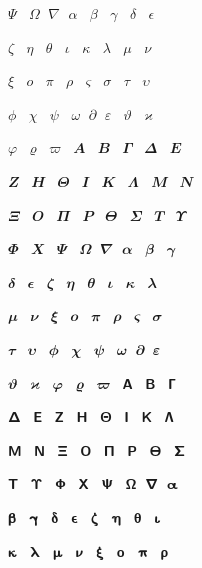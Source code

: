 \documentclass{article}
\begin{document}
$\mitPsi$ $\mitOmega$ $\mitnabla$ $\mitalpha$ $\mitbeta$ $\mitgamma$ $\mitdelta$ $\mitvarepsilon$ \par
$\mitzeta$ $\miteta$ $\mittheta$ $\mitiota$ $\mitkappa$ $\mitlambda$ $\mitmu$ $\mitnu$ \par
$\mitxi$ $\mitomicron$ $\mitpi$ $\mitrho$ $\mitvarsigma$ $\mitsigma$ $\mittau$ $\mitupsilon$ \par
$\mitvarphi$ $\mitchi$ $\mitpsi$ $\mitomega$ $\mitpartial$ $\mitepsilon$ $\mitvartheta$ $\mitvarkappa$ \par
$\mitphi$ $\mitvarrho$ $\mitvarpi$ $\mbfitAlpha$ $\mbfitBeta$ $\mbfitGamma$ $\mbfitDelta$ $\mbfitEpsilon$ \par
$\mbfitZeta$ $\mbfitEta$ $\mbfitTheta$ $\mbfitIota$ $\mbfitKappa$ $\mbfitLambda$ $\mbfitMu$ $\mbfitNu$ \par
$\mbfitXi$ $\mbfitOmicron$ $\mbfitPi$ $\mbfitRho$ $\mbfitvarTheta$ $\mbfitSigma$ $\mbfitTau$ $\mbfitUpsilon$ \par
$\mbfitPhi$ $\mbfitChi$ $\mbfitPsi$ $\mbfitOmega$ $\mbfitnabla$ $\mbfitalpha$ $\mbfitbeta$ $\mbfitgamma$ \par
$\mbfitdelta$ $\mbfitvarepsilon$ $\mbfitzeta$ $\mbfiteta$ $\mbfittheta$ $\mbfitiota$ $\mbfitkappa$ $\mbfitlambda$ \par
$\mbfitmu$ $\mbfitnu$ $\mbfitxi$ $\mbfitomicron$ $\mbfitpi$ $\mbfitrho$ $\mbfitvarsigma$ $\mbfitsigma$ \par
$\mbfittau$ $\mbfitupsilon$ $\mbfitvarphi$ $\mbfitchi$ $\mbfitpsi$ $\mbfitomega$ $\mbfitpartial$ $\mbfitepsilon$ \par
$\mbfitvartheta$ $\mbfitvarkappa$ $\mbfitphi$ $\mbfitvarrho$ $\mbfitvarpi$ $\mbfsansAlpha$ $\mbfsansBeta$ $\mbfsansGamma$ \par
$\mbfsansDelta$ $\mbfsansEpsilon$ $\mbfsansZeta$ $\mbfsansEta$ $\mbfsansTheta$ $\mbfsansIota$ $\mbfsansKappa$ $\mbfsansLambda$ \par
$\mbfsansMu$ $\mbfsansNu$ $\mbfsansXi$ $\mbfsansOmicron$ $\mbfsansPi$ $\mbfsansRho$ $\mbfsansvarTheta$ $\mbfsansSigma$ \par
$\mbfsansTau$ $\mbfsansUpsilon$ $\mbfsansPhi$ $\mbfsansChi$ $\mbfsansPsi$ $\mbfsansOmega$ $\mbfsansnabla$ $\mbfsansalpha$ \par
$\mbfsansbeta$ $\mbfsansgamma$ $\mbfsansdelta$ $\mbfsansvarepsilon$ $\mbfsanszeta$ $\mbfsanseta$ $\mbfsanstheta$ $\mbfsansiota$ \par
$\mbfsanskappa$ $\mbfsanslambda$ $\mbfsansmu$ $\mbfsansnu$ $\mbfsansxi$ $\mbfsansomicron$ $\mbfsanspi$ $\mbfsansrho$ \par
\end{document}
